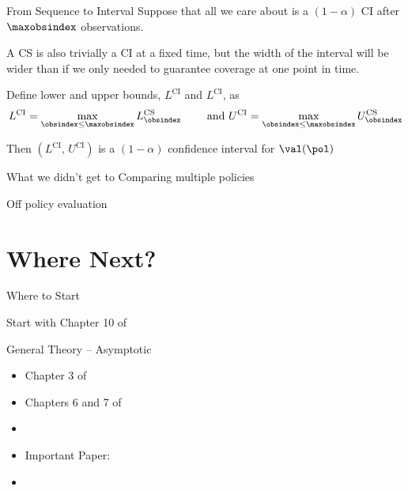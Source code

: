 \documentclass[aspectratio=169, professionalfonts]{beamer}
\begin{document}
\begin{frame}{From Sequence to Interval}
	Suppose that all we care about is a $(1 - \alpha)$ CI after $\maxobsindex$
	observations.

	\vfill
	A CS is also trivially a CI at a fixed time, but the width of the interval
	will be wider than if we only needed to guarantee coverage at one point in
	time.

	\vfill \pause

	\begin{lemma} Define lower and upper bounds, $L^{\text{CI}}$ and
		$L^{\text{CI}}$, as
		$$L^{\text{CI}} = \max_{\obsindex \leq \maxobsindex}
			L_{\obsindex}^{\text{CS}} \qquad \text{ and } U^{\text{CI}} = \max_{\obsindex \leq
				\maxobsindex} U_{\obsindex}^{\text{CS}}$$

		Then $(L^{\text{CI}},\, U^{\text{CI}})$ is a $(1 - \alpha)$ confidence
		interval for $\val(\pol)$
	\end{lemma}
\end{frame}

\begin{frame}{What we didn't get to}
	Comparing multiple policies

	Off policy evaluation
\end{frame}
\section{Where Next?}

\begin{frame}{Where to Start}
	\vfill

	Start with Chapter 10 of \cite{tsiatis2019Dynamic}
	\vfill

\end{frame}

\begin{frame}{General Theory -- Asymptotic}
	\vfill
	\begin{itemize}
		\item Chapter 3 of \cite{tsiatis2006Semiparametric}
		      \vfill
		\item Chapters 6 and 7 of \cite{vandervaart2000Asymptotic}
		      \vfill
		\item \cite{kosorok2008Introduction}
		      \vfill
		\item Important Paper: \cite{hirano2012Impossibility}
		      \vfill


		\item 	\cite{bibaut2021PostContextualBandit}
		      \vfill
	\end{itemize}
\end{frame}
\end{document}
